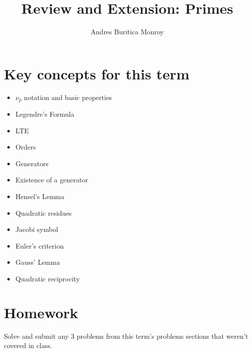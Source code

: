 \documentclass{article}
\title{Review and Extension: Primes}
\author{Andres Buritica Monroy}
\date{}
\begin{document}
\maketitle
\section{Key concepts for this term}
\begin{itemize}
  \item $\nu_p$ notation and basic properties
  \item Legendre's Formula
  \item LTE
  \item Orders
  \item Generators
  \item Existence of a generator
  \item Hensel's Lemma
  \item Quadratic residues
  \item Jacobi symbol
  \item Euler's criterion
  \item Gauss' Lemma
  \item Quadratic reciprocity
\end{itemize}
\section{Homework}
Solve and submit any 3 problems from this term's problems sections that weren't
covered in class.
\end{document}
